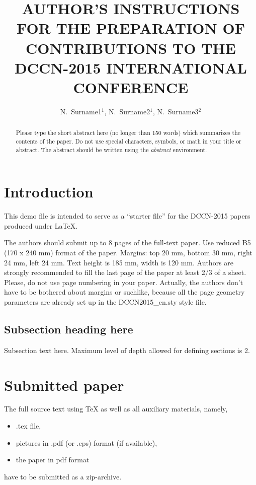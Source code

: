 \documentclass[10pt]{article}
\title{AUTHOR'S INSTRUCTIONS FOR THE PREPARATION OF CONTRIBUTIONS TO THE DCCN-2015 INTERNATIONAL CONFERENCE}
\author{N.~Surname1$^1$, N.~Surname2$^1$, N.~Surname3$^2$}
\begin{document}
\maketitle

\begin{abstract}
Please type the short abstract here (no longer than 150 words) which summarizes the contents of the paper.
Do not use special characters, symbols, or math in your title
or abstract. The abstract should be written using the \emph{abstract} environment.
\end{abstract}


\section{Introduction}

This demo file is intended to serve as a ``starter file'' for
the DCCN-2015 papers produced under \LaTeX.

The authors should submit up to 8 pages of the full-text paper. Use reduced B5
(170 x 240 mm) format of the paper. Margins: top 20 mm, bottom
30 mm, right 24 mm, left 24 mm. Text height is 185 mm, width is
120 mm. Authors are strongly recommended to fill the last page
of the paper at least 2/3 of a sheet. Please, do not use page
numbering in your paper. Actually, the authors don't have to be bothered about margins or suchlike,
because all the page geometry parameters are already set up in the DCCN2015\_en.sty style file.


\subsection{Subsection heading here}

Subsection text here. Maximum level of depth allowed for defining sections is 2.



\section{Submitted paper}

The full source text using \TeX{} as well as all auxiliary
materials, namely,
\begin{itemize}
  \item .tex file,
  \item pictures in .pdf (or .eps) format (if available),
  \item the paper in pdf format
\end{itemize}
have to be submitted as a zip-archive.
\end{document}
